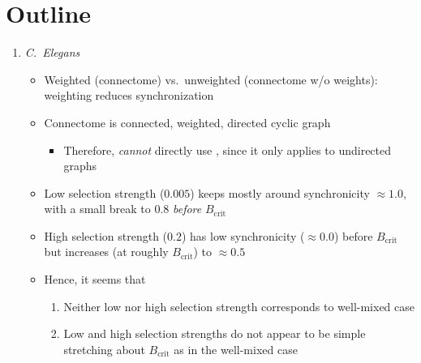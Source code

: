 \documentclass{article}
\begin{document}
\section{Outline}
\begin{enumerate}
  \item \emph{C.\ Elegans}
  \begin{itemize}
    \item Weighted (connectome) vs.\ unweighted (connectome w/o
      weights): weighting reduces synchronization
    \item Connectome is connected, weighted, directed cyclic graph
    \begin{itemize}
      \item Therefore, \emph{cannot} directly use
        \textcite{allen2017evolutionary}, since it only applies to undirected
        graphs
    \end{itemize}
    \item Low selection strength ($0.005$) keeps mostly around synchronicity
      $\approx 1.0$, with a small break to 0.8 \emph{before} $B_{\text{crit}}$
    \item High selection strength ($0.2$) has low synchronicity
      ($\approx 0.0$) before $B_{\text{crit}}$ but increases (at roughly
      $B_{\text{crit}}$) to $\approx 0.5$
    \item Hence, it seems that
    \begin{enumerate}
      \item Neither low nor high selection strength corresponds to
        well-mixed case
      \item Low and high selection strengths do not appear to be simple
        stretching about $B_{\text{crit}}$ as in the well-mixed case
    \end{enumerate}
  \end{itemize}
\end{enumerate}
\end{document}
